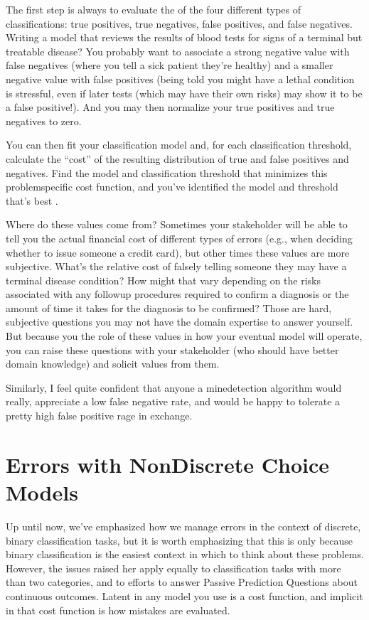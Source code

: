 \documentclass[letterpaper,10pt,english]{jupyterBook}
\begin{document}
\sphinxAtStartPar
The first step is always to evaluate the  of the four different types of classifications: true positives, true negatives, false positives, and false negatives. Writing a model that reviews the results of blood tests for signs of a terminal but treatable disease? You probably want to associate a strong negative value with false negatives (where you tell a sick patient they’re healthy) and a smaller negative value with false positives (being told you might have a lethal condition is stressful, even if later tests (which may have their own risks) may show it to be a false positive!). And you may then normalize your true positives and true negatives to zero.

\sphinxAtStartPar
You can then fit your classification model and, for each classification threshold, calculate the “cost” of the resulting distribution of true and false positives and negatives. Find the model and classification threshold that minimizes this problem\sphinxhyphen{}specific cost function, and you’ve identified the model and threshold that’s best .

\sphinxAtStartPar
Where do these values come from? Sometimes your stakeholder will be able to tell you the actual financial cost of different types of errors (e.g., when deciding whether to issue someone a credit card), but other times these values are more subjective. What’s the relative cost of falsely telling someone they may have a terminal disease condition? How might that vary depending on the risks associated with any followup procedures required to confirm a diagnosis or the amount of time it takes for the diagnosis to be confirmed? Those are hard, subjective questions you may not have the domain expertise to answer yourself. But because you  the role of these values in how your eventual model will operate, you can raise these questions with your stakeholder (who should have better domain knowledge) and solicit values from them.

\sphinxAtStartPar
Similarly, I feel quite confident that anyone  a mine\sphinxhyphen{}detection algorithm would really,  appreciate a low false negative rate, and would be happy to tolerate a pretty high false positive rage in exchange.


\section{Errors with Non\sphinxhyphen{}Discrete Choice Models}
\label{\detokenize{30_questions/24_passive_internal_errors:errors-with-non-discrete-choice-models}}
\sphinxAtStartPar
Up until now, we’ve emphasized how we manage errors in the context of discrete, binary classification tasks, but it is worth emphasizing that this is only because binary classification is the easiest context in which to think about these problems. However, the issues raised her apply equally to classification tasks with more than two categories, and to efforts to answer Passive Prediction Questions about continuous outcomes. Latent in any model you use is a cost function, and implicit in that cost function is how mistakes are evaluated.
\end{document}
